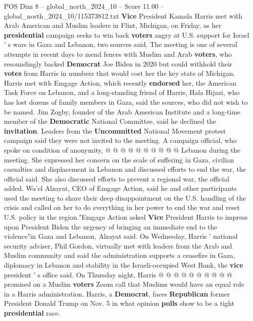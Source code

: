 \begin{textsample}{POS Dim 8 – global\_north\_2024\_10 – Score 11.00 – global\_north\_2024\_10/115373812.txt}  \label{ex:f8_pos_166}
\textbf{Vice} President Kamala Harris met with Arab American and Muslim leaders in Flint, Michigan, on Friday, as her \textbf{presidential} campaign seeks to win back \textbf{voters} angry at U.S. support for Israel ' s wars in Gaza and Lebanon, two sources said.
The meeting is one of several attempts in recent days to mend fences with Muslim and Arab \textbf{voters}, who resoundingly backed \textbf{Democrat} Joe Biden in 2020 but could withhold their \textbf{votes} from Harris in numbers that would cost her the key state of Michigan.
Harris met with Emgage Action, which recently \textbf{endorsed} her, the American Task Force on Lebanon, and a long-standing friend of Harris, Hala Hijazi, who has lost dozens of family members in Gaza, said the sources, who did not wish to be named.
Jim Zogby, founder of the Arab American Institute and a long-time member of the \textbf{Democratic} National Committee, said he declined the \textbf{invitation}.
Leaders from the \textbf{Uncommitted} National Movement protest campaign said they were not invited to the meeting.
A campaign official, who spoke on condition of anonymity, @ @ @ @ @ @ @ @ @ @ Lebanon during the meeting.
She expressed her concern on the scale of suffering in Gaza, civilian casualties and displacement in Lebanon and discussed efforts to end the war, the official said.
She also discussed efforts to prevent a regional war, the official added.
Wa'el Alzayat, CEO of Emgage Action, said he and other participants used the meeting to share their deep disappointment on the U.S. handling of the crisis and called on her to do everything in her power to end the war and reset U.S. policy in the region."Emgage Action asked \textbf{Vice} President Harris to impress upon President Biden the urgency of bringing an immediate end to the violence"in Gaza and Lebanon, Alzayat said.
On Wednesday, Harris ' national security adviser, Phil Gordon, virtually met with leaders from the Arab and Muslim community and said the administration supports a ceasefire in Gaza, diplomacy in Lebanon and stability in the Israeli-occupied West Bank, the \textbf{vice} president ' s office said.
On Thursday night, Harris @ @ @ @ @ @ @ @ @ @ promised on a Muslim \textbf{voters} Zoom call that Muslims would have an equal role in a Harris administration.
Harris, a \textbf{Democrat}, faces \textbf{Republican} former President Donald Trump on Nov. 5 in what opinion \textbf{polls} show to be a tight \textbf{presidential} race.

\end{textsample}
